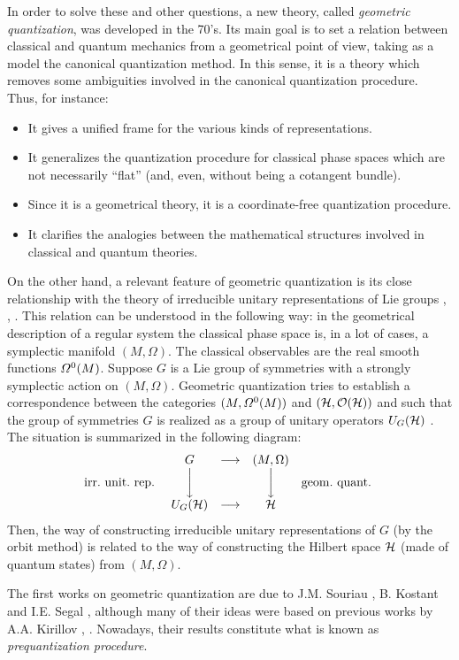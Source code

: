 \documentclass[12pt]{article}
\theoremstyle{plain}
\def\H{{\cal H}}
\begin{document}
In order to solve these and other questions,
a new theory, called {\it geometric quantization}, was developed in the
70's.
Its main goal is to set a relation between
classical and quantum mechanics from a geometrical point of view,
taking as a model the canonical quantization method.
In this sense, it is a theory which removes
some ambiguities involved in the canonical quantization procedure. Thus,
for instance:
\begin{itemize}
\item
It gives a unified frame for the various kinds of representations.
\item
It generalizes the quantization procedure for classical
phase spaces which are not necessarily ``flat''
(and, even, without being a cotangent bundle).
\item
Since it is a geometrical theory, it is a coordinate-free quantization
procedure.
\item
It clarifies the analogies between the mathematical
structures involved in classical and quantum theories.
\end{itemize}
On the other hand, a relevant feature
of geometric quantization is its close relationship
with the theory of irreducible unitary representations of Lie groups
\cite{AK-71}, \cite{Ki-62}, \cite{Ko-70}.
This relation can be understood in the following way:
in the geometrical description of a regular system
the classical phase space is, in a lot of cases, a symplectic manifold
$(M,\Omega )$. The classical observables are the real smooth
functions ${\mit\Omega}^0(M)$. Suppose $G$ is a Lie group of symmetries
with a strongly symplectic action on $(M,\Omega )$.
Geometric quantization tries to establish a correspondence between the
categories
$(M,{\mit\Omega}^0(M))$ and $(\H ,{\cal O}(\H ))$
and such that the group of symmetries $G$
is realized as a group of unitary operators $U_G(\H )$ \cite{Go-80}.
The situation is summarized in the following diagram:
$$
\begin{array}{ccccc}
& G & \longrightarrow & (M,\Omega ) &
\\
{\rm irr. \ unit. \ rep. \ } & \bigg\downarrow & &
\bigg\downarrow & {\rm geom. \ quant.\ }
\\
& U_G(\H ) & \longrightarrow & \H &
\end{array}
$$
Then, the way of constructing irreducible unitary representations
of $G$ (by the orbit method) is related to the way of constructing the
Hilbert space $\H$
(made of quantum states) from $(M,\Omega )$.

The first works on geometric quantization
are due to J.M. Souriau \cite{So-69}, B. Kostant \cite{Ko-70} and I.E.
Segal \cite{Se-60},
although many of their ideas were based on
previous works by A.A. Kirillov \cite{Ki-62}, \cite{Ki-76}.
Nowadays, their results constitute what is known as {\it prequantization
procedure}.
\end{document}
